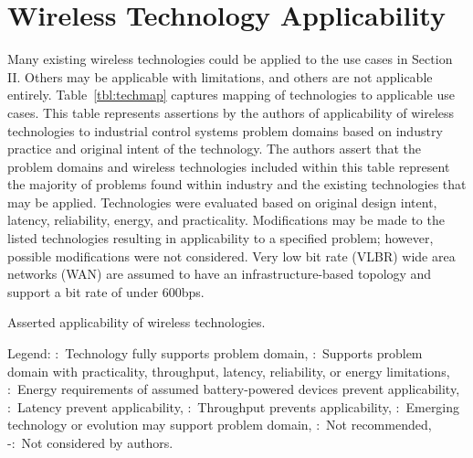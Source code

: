     \section{Wireless Technology Applicability}
    Many existing wireless technologies could be applied to the use cases in Section II.  Others may be applicable with limitations, and others are not applicable entirely. Table~\ref{tbl:techmap} captures mapping of technologies to applicable use cases.  This table represents assertions by the authors of applicability of wireless technologies to industrial control systems problem domains based on industry practice and original intent of the technology.  The authors assert that the problem domains and wireless technologies included within this table represent the majority  of problems found within industry and the existing technologies that may be applied.  Technologies were evaluated based on original design intent, latency, reliability, energy, and practicality.  Modifications may be made to the listed technologies resulting in applicability to a specified problem; however, possible modifications were not considered.  Very low bit rate (VLBR) wide area networks (WAN) are assumed to have an infrastructure-based  topology and support a bit rate of under 600bps. 
    
\begin{table}[htbp]
	\setlength{\tabcolsep}{1.4pt}
  	\centering
  	\caption{Asserted applicability of wireless technologies.}
  	\label{tbl:techmap}%
  	\begin{adjustbox}{width=\textwidth}
	
	\end{adjustbox}
	\vspace{3pt}
	\raggedright
	
	Legend: 
	\CIRCLE:~{Technology fully supports problem domain,}
	\LEFTcircle:~{Supports problem domain with practicality, throughput, latency, reliability, or energy limitations,}
	\lightning:~{Energy requirements of assumed battery-powered devices prevent applicability,}
	\clock:~{Latency prevent applicability,}
	\DOWNarrow:~{Throughput prevents applicability,}
	\hexstar:~{Emerging technology or evolution may support problem domain,}
	\fullmoon:~{Not recommended,}
	-:~{Not considered by authors.}
\end{table}%


